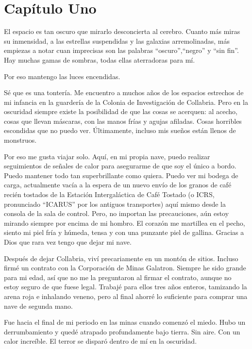 \chapter*{Capítulo Uno}


El espacio es tan oscuro que mirarlo desconcierta al cerebro. Cuanto más
miras su inmensidad, a las estrellas suspendidas y las galaxias
arremolinadas, más empiezas a notar cuan imprecisas son las palabras
``oscuro'',``negro'' y ``sin fin''. Hay muchas gamas de sombras, todas
ellas aterradoras para mí.

Por eso mantengo las luces encendidas.

Sé que es una tontería. Me encuentro a muchos años de los espacios
estrechos de mi infancia en la guardería de la Colonia de Investigación
de Collabria. Pero en la oscuridad siempre existe la posibilidad de que
las cosas se acerquen: al acecho, cosas que llevan máscaras, con las
manos frías y agujas afiladas. Cosas horribles escondidas que no puedo
ver. Últimamente, incluso mis sueños están llenos de monstruos.

Por eso me gusta viajar solo. Aquí, en mi propia nave, puedo realizar
seguimientos de señales de calor para asegurarme de que soy el único a
bordo. Puedo mantener todo tan superbrillante como quiera. Puedo ver mi
bodega de carga, actualmente vacía a la espera de un nuevo envío de los
granos de café recién tostados de la Estación Intergaláctica de Café
Tostado (o ICRS, pronunciado ``ICARUS'' por los antiguos transportes)
aquí mismo desde la consola de la sala de control. Pero, no importan las
precauciones, aún estoy mirando siempre por encima de mi hombro. El
corazón me martillea en el pecho, siento mi piel fría y húmeda, tensa y
con una punzante piel de gallina. Gracias a Dios que rara vez tengo que
dejar mi nave.

Después de dejar Collabria, viví precariamente en un montón de
sitios. Incluso firmé un contrato con la Corporación de Minas
Galatron. Siempre he sido grande para mi edad, así que no me la
preguntaron al firmar el contrato, aunque no estoy seguro de que fuese
legal. Trabajé para ellos tres años enteros, tamizando la arena roja e
inhalando veneno, pero al final ahorré lo suficiente para comprar una
nave de segunda mano.

Fue hacia el final de mi periodo en las minas cuando comenzó el
miedo. Hubo un derrumbamiento y quedé atrapado profundamente bajo
tierra. Sin aire. Con un calor increíble. El terror se disparó dentro de
mí en la oscuridad.

